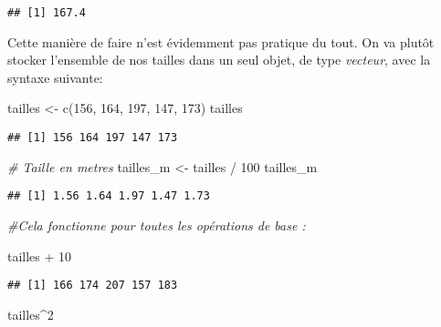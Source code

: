 \documentclass[
]{article}
\newenvironment{Shaded}{\begin{snugshade}}{\end{snugshade}}
\newcommand{\CommentTok}[1]{\textcolor[rgb]{0.56,0.35,0.01}{\textit{#1}}}
\newcommand{\DecValTok}[1]{\textcolor[rgb]{0.00,0.00,0.81}{#1}}
\newcommand{\FunctionTok}[1]{\textcolor[rgb]{0.00,0.00,0.00}{#1}}
\newcommand{\NormalTok}[1]{#1}
\newcommand{\OtherTok}[1]{\textcolor[rgb]{0.56,0.35,0.01}{#1}}
\newcommand{\SpecialCharTok}[1]{\textcolor[rgb]{0.00,0.00,0.00}{#1}}
\begin{document}
\begin{verbatim}
## [1] 167.4
\end{verbatim}

Cette manière de faire n'est évidemment pas pratique du tout. On va
plutôt stocker l'ensemble de nos tailles dans un seul objet, de type
\emph{vecteur}, avec la syntaxe suivante:

\begin{Shaded}
\begin{Highlighting}[]
\NormalTok{tailles }\OtherTok{\textless{}{-}} \FunctionTok{c}\NormalTok{(}\DecValTok{156}\NormalTok{, }\DecValTok{164}\NormalTok{, }\DecValTok{197}\NormalTok{, }\DecValTok{147}\NormalTok{, }\DecValTok{173}\NormalTok{)}
\NormalTok{tailles}
\end{Highlighting}
\end{Shaded}

\begin{verbatim}
## [1] 156 164 197 147 173
\end{verbatim}

\begin{Shaded}
\begin{Highlighting}[]
\CommentTok{\# Taille en metres}
\NormalTok{tailles\_m }\OtherTok{\textless{}{-}}\NormalTok{ tailles }\SpecialCharTok{/} \DecValTok{100}
\NormalTok{tailles\_m}
\end{Highlighting}
\end{Shaded}

\begin{verbatim}
## [1] 1.56 1.64 1.97 1.47 1.73
\end{verbatim}

\begin{Shaded}
\begin{Highlighting}[]
\CommentTok{\#Cela fonctionne pour toutes les opérations de base :}

\NormalTok{tailles }\SpecialCharTok{+} \DecValTok{10}
\end{Highlighting}
\end{Shaded}

\begin{verbatim}
## [1] 166 174 207 157 183
\end{verbatim}

\begin{Shaded}
\begin{Highlighting}[]
\NormalTok{tailles}\SpecialCharTok{\^{}}\DecValTok{2}
\end{Highlighting}
\end{Shaded}
\end{document}
